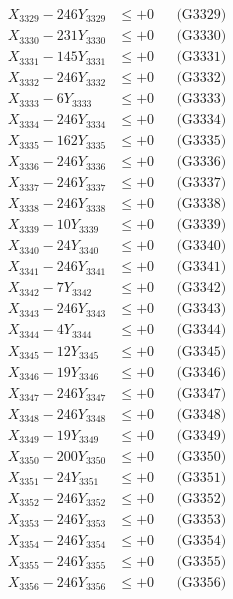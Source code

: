 \documentclass[a4paper,10pt]{article}
\begin{document}
{\begin{align}
X_{3329} - 246Y_{3329} &\leq +0 && \text{(G3329)} \\
X_{3330} - 231Y_{3330} &\leq +0 && \text{(G3330)} \\
\allowbreak
X_{3331} - 145Y_{3331} &\leq +0 && \text{(G3331)} \\
X_{3332} - 246Y_{3332} &\leq +0 && \text{(G3332)} \\
X_{3333} - 6Y_{3333} &\leq +0 && \text{(G3333)} \\
X_{3334} - 246Y_{3334} &\leq +0 && \text{(G3334)} \\
X_{3335} - 162Y_{3335} &\leq +0 && \text{(G3335)} \\
X_{3336} - 246Y_{3336} &\leq +0 && \text{(G3336)} \\
X_{3337} - 246Y_{3337} &\leq +0 && \text{(G3337)} \\
X_{3338} - 246Y_{3338} &\leq +0 && \text{(G3338)} \\
X_{3339} - 10Y_{3339} &\leq +0 && \text{(G3339)} \\
X_{3340} - 24Y_{3340} &\leq +0 && \text{(G3340)} \\
\allowbreak
X_{3341} - 246Y_{3341} &\leq +0 && \text{(G3341)} \\
X_{3342} - 7Y_{3342} &\leq +0 && \text{(G3342)} \\
X_{3343} - 246Y_{3343} &\leq +0 && \text{(G3343)} \\
X_{3344} - 4Y_{3344} &\leq +0 && \text{(G3344)} \\
X_{3345} - 12Y_{3345} &\leq +0 && \text{(G3345)} \\
X_{3346} - 19Y_{3346} &\leq +0 && \text{(G3346)} \\
X_{3347} - 246Y_{3347} &\leq +0 && \text{(G3347)} \\
X_{3348} - 246Y_{3348} &\leq +0 && \text{(G3348)} \\
X_{3349} - 19Y_{3349} &\leq +0 && \text{(G3349)} \\
X_{3350} - 200Y_{3350} &\leq +0 && \text{(G3350)} \\
\allowbreak
X_{3351} - 24Y_{3351} &\leq +0 && \text{(G3351)} \\
X_{3352} - 246Y_{3352} &\leq +0 && \text{(G3352)} \\
X_{3353} - 246Y_{3353} &\leq +0 && \text{(G3353)} \\
X_{3354} - 246Y_{3354} &\leq +0 && \text{(G3354)} \\
X_{3355} - 246Y_{3355} &\leq +0 && \text{(G3355)} \\
X_{3356} - 246Y_{3356} &\leq +0 && \text{(G3356)} \\

\end{align}}
\end{document}
